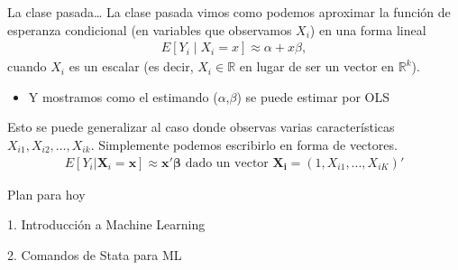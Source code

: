 \documentclass[11pt,handout,aspectratio=169]{beamer}
\begin{document}
\begin{frame}{La clase pasada\dots}
La clase pasada vimos como podemos aproximar la función de esperanza condicional (en variables que observamos $X_i$) en una forma lineal 
\begin{align*}
E[Y_i \mid X_i =x ] \approx \alpha + x \beta ,
\end{align*}
cuando $X_i$ es un escalar (es decir, $X_i\in \mathbb{R}$ en lugar de ser un vector en $\mathbb{R}^k$).
			\begin{itemize}
					\item 
					Y mostramos como el estimando ($\alpha$,$\beta$) se puede estimar por OLS
				\end{itemize}

\vspace{.5cm}
Esto se puede generalizar al caso donde observas varias características $X_{i1}, X_{i2}, \dots, X_{ik}$. Simplemente podemos escribirlo en forma de vectores. 
\begin{align*}
E[Y_i| \mathbf{X}_i =\mathbf{x} ] \approx \mathbf{x}' \bm{\beta} \text{ dado un vector } \mathbf{X_i} = (1,X_{i1},...,X_{iK})'
\end{align*}

\end{frame}

	
	\begin{frame}{Plan para hoy}

	1. Introducción a Machine Learning
	\vspace{0.8cm}
	
	2. Comandos de Stata para ML
	
	\end{frame}
	
	
\end{document}
